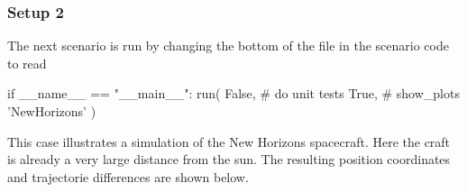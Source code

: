 \subsubsection*{Setup 2 }

The next scenario is run by changing the bottom of the file in the scenario code to read 
\begin{DoxyCode}
\textcolor{keywordflow}{if} \_\_name\_\_ == \textcolor{stringliteral}{"\_\_main\_\_"}:
    run( \textcolor{keyword}{False},       \textcolor{comment}{# do unit tests}
         \textcolor{keyword}{True},        \textcolor{comment}{# show\_plots}
         \textcolor{stringliteral}{'NewHorizons'}
       )
\end{DoxyCode}
 This case illustrates a simulation of the New Horizons spacecraft. Here the craft is already a very large distance from the sun. The resulting position coordinates and trajectorie differences are shown below.   